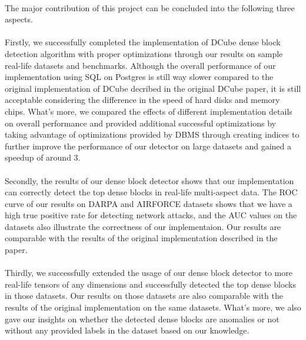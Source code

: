 \paragraph{} The major contribution of this project can be concluded into the following three aspects. 
\paragraph{} Firstly, we successfully completed the implementation of DCube dense block detection algorithm with proper optimizations through our results on sample real-life datasets and benchmarks.
Although the overall performance of our implementation using SQL on Postgres is still way slower compared to the original implementation of DCube decribed in the original DCube paper,
it is still acceptable considering the difference in the speed of hard disks and memory chips. What's more, we compared the effects of different implementation details on overall performance
and provided additional successful optimizations by taking advantage of optimizations provided by DBMS through creating indices to further improve the performance of our detector on large datasets and
gained a speedup of around 3.
\paragraph{} Secondly, the results of our dense block detector shows that our implementation can correctly detect the top dense blocks in real-life multi-aspect data. The ROC curve of
our results on DARPA and AIRFORCE datasets shows that we have a high true positive rate for detecting network attacks, and the AUC values on the datasets also illustrate the correctness of our implementaion.
Our results are comparable with the results of the original implementation described in the paper.
\paragraph{} Thirdly, we successfully extended the usage of our dense block detector to more real-life tensors of any dimensions and successfully detected the top dense blocks in those datasets.
Our results on those datasets are also comparable with the results of the original implementation on the same datasets. What's more, we also gave our insights on whether the detected dense
blocks are anomalies or not without any provided labels in the dataset based on our knowledge.
